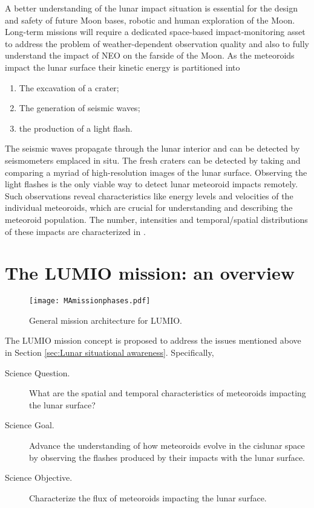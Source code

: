 A better understanding of the lunar impact situation is essential for the design and safety of future Moon bases, robotic and human exploration of the Moon. Long-term missions will require a dedicated space-based impact-monitoring asset to address the problem of weather-dependent observation quality and also to fully understand the impact of NEO on the farside of the Moon. As the meteoroids impact the lunar surface their kinetic energy is partitioned into
%
\begin{enumerate}
	\item The excavation of a crater;
	\item The generation of seismic waves;
	\item the production of a light flash.
\end{enumerate}
%
The seismic waves propagate through the lunar interior and can be detected by seismometers emplaced in situ. The fresh craters can be detected by taking and comparing a myriad of high-resolution images of the lunar surface. Observing the light flashes is the only viable way to detect lunar meteoroid impacts remotely. Such observations reveal characteristics like energy levels and velocities of the individual meteoroids, which are crucial for understanding and describing the meteoroid population. The number, intensities and temporal/spatial distributions of these impacts are characterized in \textcite{oberst2012present}.


%
\section{The LUMIO mission: an overview}\label{sec:LUMIO mission}
%
\begin{figure*}[t!]
	\centering
	\texttt{[image: MAmissionphases.pdf]}
	\caption{General mission architecture for LUMIO.}
	\label{fig:LUMIOGeneralArchitecture}
\end{figure*}
%
The {LUMIO} mission concept is proposed to address the issues mentioned above in Section \ref{sec:Lunar situational awareness}. Specifically,
%
\begin{description}
	\item[Science Question.] What are the spatial and temporal characteristics of meteoroids impacting the lunar surface?
	\item[Science Goal.] Advance the understanding of how meteoroids evolve in the cislunar space by observing the flashes produced by their impacts with the lunar surface.
	\item[Science Objective.]  Characterize the flux of meteoroids impacting the lunar surface.
\end{description}
%

